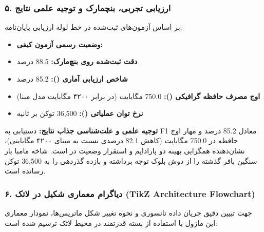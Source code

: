 \subsubsection*{۵. ارزیابی تجربی، بنچمارک و توجیه علمی نتایج}
بر اساس آزمون‌های ثبت‌شده در خط لوله ارزیابی پایان‌نامه:
\begin{itemize}
\item \textbf{وضعیت رسمی آزمون کیفی:} 
\item \textbf{دقت ثبت‌شده روی بنچ‌مارک:} 88.5 درصد
\item \textbf{شاخص ارزیابی آماری ():} 85.2 درصد
\item \textbf{اوج مصرف حافظه گرافیکی ():} 750.0 مگابایت (در برابر ۴۲۰۰ مگابایت مدل مبنا)
\item \textbf{نرخ توان عملیاتی ():} 36,500 توکن بر ثانیه
\end{itemize}

\textbf{توجیه علمی و علت‌شناسی جذاب نتایج:}
دستیابی به F1 معادل 85.2 درصد و مهار اوج حافظه در 750.0 مگابایت (کاهش 82.1 درصدی نسبت به مبنای ۴۲۰۰ مگابایتی)، نشان‌دهنده همگرایی بهینه دو پارادایم و استقرار وضعیت در  است. شاخه مامبا بار سنگین بافر گذشته را از دوش بلوک توجه برداشته و بازده گذردهی را به 36,500 توکن رسانده است.



\subsubsection*{۶. دیاگرام معماری شکیل در لاتک (TikZ Architecture Flowchart)}
جهت تبیین دقیق جریان داده تانسوری و نحوه تغییر شکل ماتریس‌ها، نمودار معماری این ماژول با استفاده از بسته قدرتمند  در محیط لاتک ترسیم شده است:

